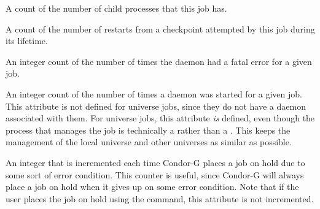 \begin{description}
\item[\AdAttr{NumPids}:]  A count of the number of child processes that
this job has.

\item[\AdAttr{NumRestarts}:]  A count of the number of restarts from a
checkpoint attempted by this job during its lifetime.

\item[\AdAttr{NumShadowExceptions}:]  An integer count of the number of
  times the  daemon had a fatal error for a given job.

\item[\AdAttr{NumShadowStarts}:]  An integer count of the number of
  times a  daemon was started for a given job.
  This attribute is not defined for
   universe jobs, since
  they do not have a  daemon associated with them.
  For  universe jobs, this attribute \emph{is}
  defined, even though the process that manages the job is technically
  a  rather than a .  
  This keeps the management of the
  local universe and other universes as similar as possible.

\item[\AdAttr{NumSystemHolds}:]   An integer that is incremented each time
Condor-G places a job on hold due to some sort of error condition.  This
counter is useful, since Condor-G will always place a job on hold when it
gives up on some error condition.  Note that if the user places the job
on hold using the  command, this attribute is not incremented.


\end{description}
